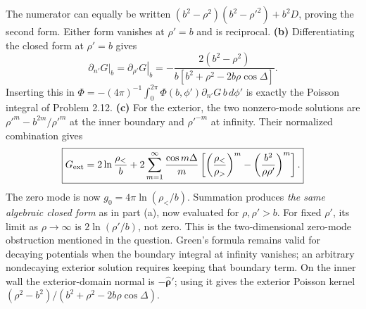 The numerator can equally be written
$(b^2-\rho^2)(b^2-\rho'^2)+b^2D$, proving the second form.
Either form vanishes at $\rho'=b$ and is reciprocal.
\textbf{(b)} Differentiating the closed form at $\rho'=b$ gives
\[
\left.\partial_{n'}G\right|_b
=\left.\partial_{\rho'}G\right|_b
=-\frac{2(b^2-\rho^2)}{b[b^2+\rho^2-2b\rho\cos\Delta]}.
\]
Inserting this in
$\Phi=-(4\pi)^{-1}\int_0^{2\pi}\Phi(b,\phi')\partial_{n'}G\,b\,d\phi'$
is exactly the Poisson integral of Problem 2.12.
\textbf{(c)} For the exterior, the two nonzero-mode solutions are
$\rho'^m-b^{2m}/\rho'^m$ at the inner boundary and $\rho'^{-m}$
at infinity. Their normalized combination gives
\[
\boxed{G_{\rm ext}=2\ln\frac{\rho_<}b
 +2\sum_{m=1}^\infty\frac{\cos m\Delta}{m}
 \left[\left(\frac{\rho_<}{\rho_>}\right)^m
                   -\left(\frac{b^2}{\rho\rho'}\right)^m\right].}
\]
The zero mode is now $g_0=4\pi\ln(\rho_</b)$. Summation produces
\emph{the same algebraic closed form} as in part (a), now evaluated
for $\rho,\rho'>b$. For fixed $\rho'$, its limit as $\rho\to\infty$
is $2\ln(\rho'/b)$, not zero. This is the two-dimensional zero-mode
obstruction mentioned in the question. Green's formula remains valid
for decaying potentials when the boundary integral at infinity
vanishes; an arbitrary nondecaying exterior solution requires keeping
that boundary term. On the inner wall the exterior-domain normal is
$-\widehat{\boldsymbol\rho}'$; using it gives the exterior Poisson
kernel $(\rho^2-b^2)/(b^2+\rho^2-2b\rho\cos\Delta)$.

